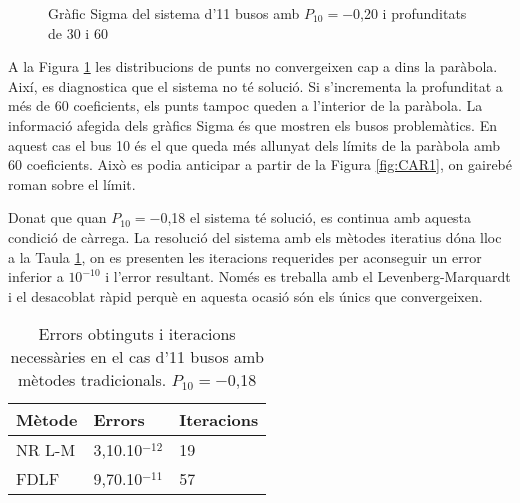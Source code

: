 \begin{figure}[!ht]
\begin{center}
  \caption{Gràfic Sigma del sistema d'11 busos amb $P_{10}=-$0,20 i profunditats de 30 i 60}
  \label{fig:CAR2}
  \end{center}
\end{figure}

A la Figura \ref{fig:CAR2} les distribucions de punts no convergeixen cap a dins la paràbola. Així, es diagnostica que el sistema no té solució. Si s'incrementa la profunditat a més de 60 coeficients, els punts tampoc queden a l'interior de la paràbola. La informació afegida dels gràfics Sigma és que mostren els busos problemàtics. En aquest cas el bus 10 és el que queda més allunyat dels límits de la paràbola amb 60 coeficients. Això es podia anticipar a partir de la Figura \ref{fig:CAR1}, on gairebé roman sobre el límit.

Donat que quan $P_{10}=-$0,18 el sistema té solució, es continua amb aquesta condició de càrrega. La resolució del sistema amb els mètodes iteratius dóna lloc a la Taula \ref{tab:CAR3}, on es presenten les iteracions requerides per aconseguir un error inferior a $10^{-10}$ i l'error resultant. Només es treballa amb el Levenberg-Marquardt i el desacoblat ràpid perquè en aquesta ocasió són els únics que convergeixen.

\begin{table}[!htb]
  \begin{center}
  \begin{tabular}{lll}
  \hline
  Mètode & Errors & Iteracions\\
  \hline
  \hline
  NR L-M & 3,10.10$^{-12}$ & 19\\ 
  FDLF & 9,70.10$^{-11}$ & 57\\
  \hline 
  \end{tabular}
  \caption{Errors obtinguts i iteracions necessàries en el cas d'11 busos amb mètodes tradicionals. $P_{10}=-$0,18}
  \label{tab:CAR3}
  \end{center}
\end{table}

